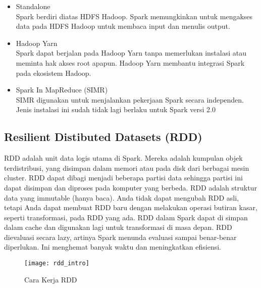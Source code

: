 \begin{itemize}
\item Standalone\\  
Spark berdiri diatas HDFS Hadoop. Spark memungkinkan untuk mengakses data pada HDFS Hadoop untuk membaca input dan menulis output.

\item Hadoop Yarn\\
Spark dapat berjalan pada Hadoop Yarn tanpa memerlukan instalasi atau meminta hak akses root apapun. Hadoop Yarn membantu integrasi Spark pada ekosistem Hadoop.

\item Spark In MapReduce (SIMR)\\ 
SIMR digunakan untuk menjalankan pekerjaan Spark secara independen. Jenis instalasi ini sudah tidak lagi berlaku untuk Spark versi 2.0
\end{itemize}

\subsection{Resilient Distibuted Datasets (RDD)}
\par RDD adalah unit data logis utama di Spark. Mereka adalah kumpulan objek terdistribusi, yang disimpan dalam memori atau pada disk dari berbagai mesin cluster. RDD dapat dibagi menjadi beberapa partisi data sehingga partisi ini dapat disimpan dan diproses pada komputer yang berbeda. RDD adalah struktur data yang immutable (hanya baca). Anda tidak dapat mengubah RDD asli, tetapi Anda dapat membuat RDD baru dengan melakukan operasi butiran kasar, seperti transformasi, pada RDD yang ada. RDD dalam Spark dapat di simpan dalam cache dan digunakan lagi untuk transformasi di masa depan. RDD dievaluasi secara lazy, artinya Spark menunda evaluasi sampai benar-benar diperlukan. Ini menghemat banyak waktu dan meningkatkan efisiensi.

\begin{figure}[H]
	\centering
	\texttt{[image: rdd\_intro]}
	\caption{Cara Kerja RDD}
	\label{fig:rdd_intro}
\end{figure}

